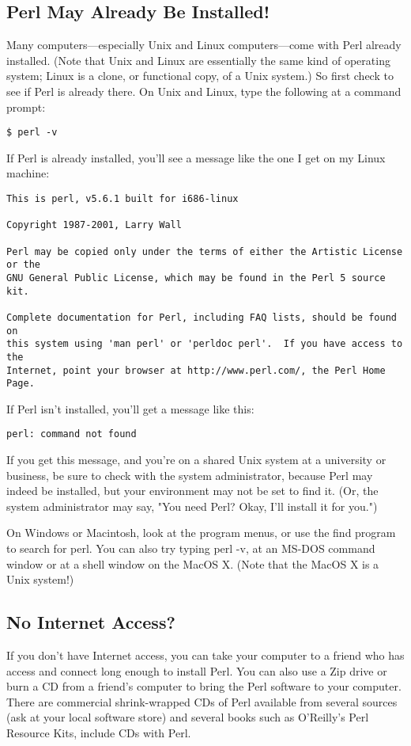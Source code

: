 \subsection{Perl May Already Be Installed!}
Many computers—especially Unix and Linux computers—come with Perl already installed. (Note that Unix and Linux are essentially the same kind of operating system; Linux is a clone, or functional copy, of a Unix system.) So first check to see if Perl is already there. On Unix and Linux, type the following at a command prompt:

\verb|$ perl -v|

If Perl is already installed, you'll see a message like the one I get on my Linux machine:

\begin{verbatim}
This is perl, v5.6.1 built for i686-linux

Copyright 1987-2001, Larry Wall

Perl may be copied only under the terms of either the Artistic License or the
GNU General Public License, which may be found in the Perl 5 source kit.

Complete documentation for Perl, including FAQ lists, should be found on
this system using 'man perl' or 'perldoc perl'.  If you have access to the
Internet, point your browser at http://www.perl.com/, the Perl Home Page.
\end{verbatim}

If Perl isn't installed, you'll get a message like this:

\begin{verbatim}
perl: command not found
\end{verbatim}

If you get this message, and you're on a shared Unix system at a university or business, be sure to check with the system administrator, because Perl may indeed be installed, but your environment may not be set to find it. (Or, the system administrator may say, "You need Perl? Okay, I'll install it for you.")

On Windows or Macintosh, look at the program menus, or use the find program to search for perl. You can also try typing perl -v, at an MS-DOS command window or at a shell window on the MacOS X. (Note that
the MacOS X is a Unix system!)

\subsection{No Internet Access?}
If you don't have Internet access, you can take your computer to a friend who has access and connect long enough to install Perl. You can also use a Zip drive or burn a CD from a friend's computer to bring the Perl software to your computer. There are commercial shrink-wrapped CDs of Perl available from several sources (ask at your local software store) and several books such as O'Reilly's Perl Resource Kits, include CDs with Perl.

